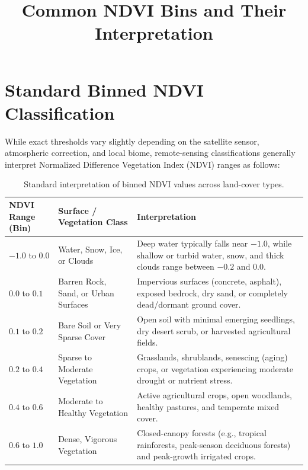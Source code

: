 \documentclass[11pt,a4paper]{article}
\title{Common NDVI Bins and Their Interpretation}
\date{}
\begin{document}
\maketitle

\section*{Standard Binned NDVI Classification}

While exact thresholds vary slightly depending on the satellite sensor, atmospheric correction, and local biome, remote-sensing classifications generally interpret Normalized Difference Vegetation Index (NDVI) ranges as follows:

\begin{table}[h!]
\centering
\renewcommand{\arraystretch}{1.35}
\begin{tabularx}{\textwidth}{L{2.4cm} L{4.2cm} Y}
\toprule
\textbf{NDVI Range (Bin)} & \textbf{Surface / Vegetation Class} & \textbf{Interpretation} \\
\midrule
$-1.0$ to $0.0$ & Water, Snow, Ice, or Clouds & Deep water typically falls near $-1.0$, while shallow or turbid water, snow, and thick clouds range between $-0.2$ and $0.0$. \\
$0.0$ to $0.1$ & Barren Rock, Sand, or Urban Surfaces & Impervious surfaces (concrete, asphalt), exposed bedrock, dry sand, or completely dead/dormant ground cover. \\
$0.1$ to $0.2$ & Bare Soil or Very Sparse Cover & Open soil with minimal emerging seedlings, dry desert scrub, or harvested agricultural fields. \\
$0.2$ to $0.4$ & Sparse to Moderate Vegetation & Grasslands, shrublands, senescing (aging) crops, or vegetation experiencing moderate drought or nutrient stress. \\
$0.4$ to $0.6$ & Moderate to Healthy Vegetation & Active agricultural crops, open woodlands, healthy pastures, and temperate mixed cover. \\
$0.6$ to $1.0$ & Dense, Vigorous Vegetation & Closed-canopy forests (e.g., tropical rainforests, peak-season deciduous forests) and peak-growth irrigated crops. \\
\bottomrule
\end{tabularx}
\caption{Standard interpretation of binned NDVI values across land-cover types.}
\end{table}
\end{document}
